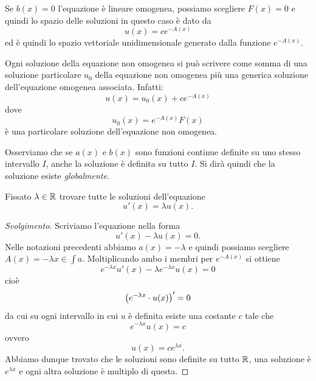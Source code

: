 Se $b(x)=0$ l'equazione è lineare omogenea, possiamo scegliere $F(x) = 0$
e quindi lo spazio delle soluzioni in questo caso
è dato da
\[
  u(x) = c e^{-A(x)}
\]
ed è quindi lo spazio vettoriale unidimensionale generato dalla funzione $e^{-A(x)}$.

Ogni soluzione della equazione non omogenea si può scrivere come somma di una
soluzione particolare $u_0$ della equazione non omogenea
più una generica soluzione dell'equazione omogenea associata. Infatti:
\[
  u(x) = u_0(x) + c e^{-A(x)}
\]
dove
\[
  u_0(x) = e^{-A(x)}F(x)
\]
è una particolare soluzione dell'equazione non omogenea.

Osserviamo che se $a(x)$ e $b(x)$ sono funzioni continue definite su uno stesso
intervallo $I$, anche la soluzione è definita su tutto $I$.
Si dirà quindi che la soluzione esiste \emph{globalmente}.

\begin{exercise}
Fissato $\lambda \in \mathbb R$ trovare tutte le soluzioni dell'equazione
\[
  u'(x) = \lambda u(x).
\]
\end{exercise}
%
\begin{proof}[Svolgimento]
Scriviamo l'equazione nella forma
\[
  u'(x) - \lambda u(x) = 0.
\]
Nelle notazioni precedenti abbiamo $a(x) = -\lambda$ e quindi possiamo scegliere $A(x) = -\lambda x \in \int a$.
Moltiplicando ambo i membri per $e^{-A(x)}$ si ottiene
\[
  e^{-\lambda x} u'(x) - \lambda e^{-\lambda x} u(x) = 0
\]
cioè
\[
 {\left( e^{-\lambda x}\cdot u(x) \right)}' = 0
\]
da cui su ogni intervallo in cui $u$ è definita esiste una costante $c$ tale che
\[
  e^{-\lambda x} u(x) = c
\]
ovvero
\[
  u(x) = c e^{\lambda x}.
\]
Abbiamo dunque trovato che le soluzioni sono definite su tutto $\mathbb R$, una soluzione è $e^{\lambda x}$ e ogni altra soluzione è multiplo di questa.
\end{proof}

